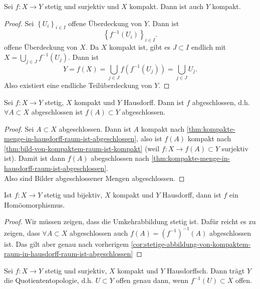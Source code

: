 \begin{theorem}\label{thm:bild-von-kompaktem-raum-ist-kompakt}
    Sei $f: X \to  Y$ stetig und surjektiv und $X$ kompakt. Dann ist auch  $Y$ kompakt. 
\end{theorem}
\begin{proof}
    Sei $\left \{U_i\right\} _{i \in I}$ offene Überdeckung von $Y$. Dann ist
     \[
         \left \{f^{-1}(U_i)\right\} _{i \in I}
    .\] 
    offene Überdeckung von $X$. Da  $X$ kompakt ist, gibt es  $J\subset I$ endlich mit $X = \bigcup_{j\in J} f^{-1}(U_j)$. Dann ist 
    \[
        Y = f(X) = \bigcup_{j\in J} f(f^{-1}(U_j)) = \bigcup_{j\in J} U_j
    .\] 
    Also existiert eine endliche Teilüberdeckung von $Y$.
\end{proof}
\begin{corollary}\label{cor:stetige-abbildung-von-kompaktem-raum-in-hausdorff-raum-ist-abgeschlossen}
    Sei $f: X \to  Y$ stetig, $X$ kompakt und  $Y$ Hausdorff. Dann ist  $f$ abgeschlossen, d.h. $\forall A\subset X$ abgeschlossen ist $f(A) \subset Y$ abgeschlossen.
\end{corollary}
\begin{proof}
    Sei $A\subset X$ abgeschlossen. Dann ist $A$ kompakt nach \autoref{thm:kompakte-menge-in-hausdorff-raum-ist-abgeschlossen}, also ist  $f(A)$ kompakt nach \autoref{thm:bild-von-kompaktem-raum-ist-kompakt} (weil $f: X \to f(A)\subset Y$ surjektiv ist). Damit ist dann $f(A)$ abegschlossen nach \autoref{thm:kompakte-menge-in-hausdorff-raum-ist-abgeschlossen}. \\
    Also sind Bilder abgeschlossener Mengen abgeschlossen.
\end{proof}

\begin{corollary}[Homöomorphismen]\label{cor:stetige-bijektion-von-kompaktem-raum-in-hausdorff-raum-ist-homöomorphismus}
    Ist $f: X \to  Y$ stetig und bijektiv, $X$ kompakt und  $Y$ Hausdorff, dann ist  $f$ ein Homöomorphismus.
\end{corollary}

\begin{proof}
    Wir müssen zeigen, dass die Umkehrabbildung stetig ist. Dafür reicht es zu zeigen, dass $\forall A\subset X$ abgeschlossen auch $f(A) = (f^{-1})^{-1}(A)$ abgeschlossen ist. Das gilt aber genau nach vorherigem \autoref{cor:stetige-abbildung-von-kompaktem-raum-in-hausdorff-raum-ist-abgeschlossen}
\end{proof}
\begin{corollary}\label{cor:abbildung-von-kompaktem-raum-in-hausdorff-raum-ist-quotientenabbildung}
    Sei $f: X \to  Y$ stetig und surjektiv, $X$ kompakt und  $Y$ Hausdorffsch. Dann trägt  $Y$ die Quotiententopologie, d.h.  $U\subset Y$ offen genau dann, wenn $f^{-1}(U) \subset X$ offen.
\end{corollary}

